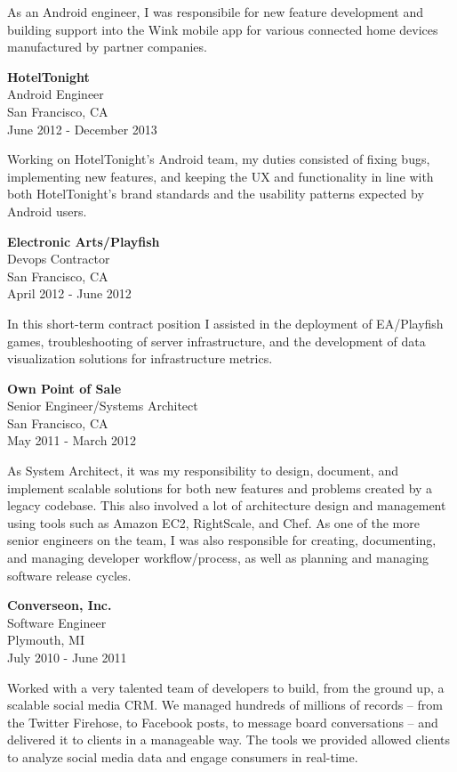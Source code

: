 \documentclass[]{article}
\begin{document}
As an Android engineer, I was responsibile for new feature development
and building support into the Wink mobile app for various connected home
devices manufactured by partner companies.

\textbf{HotelTonight}\\
Android Engineer\\
San Francisco, CA\\
June 2012 - December 2013

Working on HotelTonight's Android team, my duties consisted of fixing
bugs, implementing new features, and keeping the UX and functionality in
line with both HotelTonight's brand standards and the usability patterns
expected by Android users.

\textbf{Electronic Arts/Playfish}\\
Devops Contractor\\
San Francisco, CA\\
April 2012 - June 2012

In this short-term contract position I assisted in the deployment of
EA/Playfish games, troubleshooting of server infrastructure, and the
development of data visualization solutions for infrastructure metrics.

\textbf{Own Point of Sale}\\
Senior Engineer/Systems Architect\\
San Francisco, CA\\
May 2011 - March 2012

As System Architect, it was my responsibility to design, document, and
implement scalable solutions for both new features and problems created
by a legacy codebase. This also involved a lot of architecture design
and management using tools such as Amazon EC2, RightScale, and Chef. As
one of the more senior engineers on the team, I was also responsible for
creating, documenting, and managing developer workflow/process, as well
as planning and managing software release cycles.

\textbf{Converseon, Inc.}\\
Software Engineer\\
Plymouth, MI\\
July 2010 - June 2011

Worked with a very talented team of developers to build, from the ground
up, a scalable social media CRM. We managed hundreds of millions of
records -- from the Twitter Firehose, to Facebook posts, to message
board conversations -- and delivered it to clients in a manageable way.
The tools we provided allowed clients to analyze social media data and
engage consumers in real-time.
\end{document}
